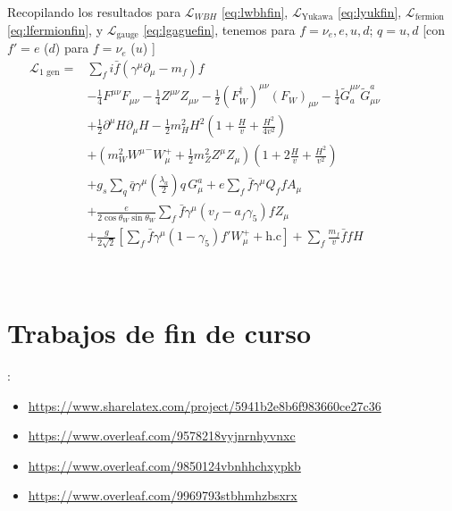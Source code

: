 Recopilando los resultados para $\mathcal{L}_{WBH}$ \eqref{eq:lwbhfin}, $\mathcal{L}_{\text{Yukawa}}$ \eqref{eq:lyukfin}, $\mathcal{L}_{\text{fermion}}$ \eqref{eq:lfermionfin}, y $\mathcal{L}_{\text{gauge}}$ \eqref{eq:lgaguefin}, tenemos  para $f=\nu_e,e,u,d$; $q=u,d$ [con $f'=e$ ($d$) para $f=\nu_e$ ($u$) ]
\begin{align}
  \mathcal{L}_{\text{1 gen}}=&\sum_f i\bar{f}\left(\gamma^\mu\partial_\mu-m_f\right)f\nonumber\\
&-\tfrac{1}{4}F^{\mu\nu} F_{\mu\nu}-\tfrac{1}{4}Z^{\mu\nu} Z_{\mu\nu}-\tfrac{1}{2}(F_W^\dagger)^{\mu\nu} (F_W)_{\mu\nu}
- \tfrac{1}{4}\widetilde{G}^{\mu\nu}_a \widetilde{G}_{\mu\nu}^a\nonumber\\
&+\tfrac{1}{2}\partial^\mu H\partial_\mu H
-\frac{1}{2}m_H^2H^2\left(1+\frac{H}{v}+\frac{H^2}{4v^2}\right)\nonumber\\
&+\left(m_W^2{W^\mu}^-W_\mu^++\frac{1}{2}m_Z^2Z^\mu Z_\mu\right)\left(1+2\frac{H}{v}+\frac{H^2}{v^2}\right)\nonumber\\
&+g_s\sum_q\bar{q}\gamma^\mu\left(\frac{\lambda_a}{2}\right)q\,G_\mu^a+e\sum_f \bar{f}\gamma^\mu Q_f f A_\mu\nonumber\\
&+\frac{e}{2\cos\theta_W\sin\theta_W}\sum_{f}\bar{f}\gamma^\mu(v_f-a_f\gamma_5)f Z_\mu\nonumber\\
&+\frac{g}{2\sqrt{2}}\left[\sum_{f}\bar{f}\gamma^\mu(1-\gamma_5)f' W_\mu^++\text{h.c}\right]
+\sum_f \frac{m_f}{v} \bar{f}f H\nonumber\\
&\phantom{- \frac{1}{4}\left(g_s\widetilde{G}^{\mu\nu}_af_{a d e}G^d_\mu G^e_\nu
    +g_sf^{a b c}G_b^\mu G_c^\nu\widetilde{G}_{\mu\nu}^a
    +g_s^2f^{a b c}f_{a d e}G_b^\mu G_c^\nu G^d_\mu G^e_\nu\right)\,.}\nonumber
\end{align}


\chapter{Trabajos de fin de curso}:
\begin{itemize}
\item \url{https://www.sharelatex.com/project/5941b2e8b6f983660ce27c36}
\item \url{https://www.overleaf.com/9578218vyjnrnhyvnxc}
\item \url{https://www.overleaf.com/9850124vbnhhchxypkb}
\item \url{https://www.overleaf.com/9969793stbhmhzbsxrx}
\end{itemize}



